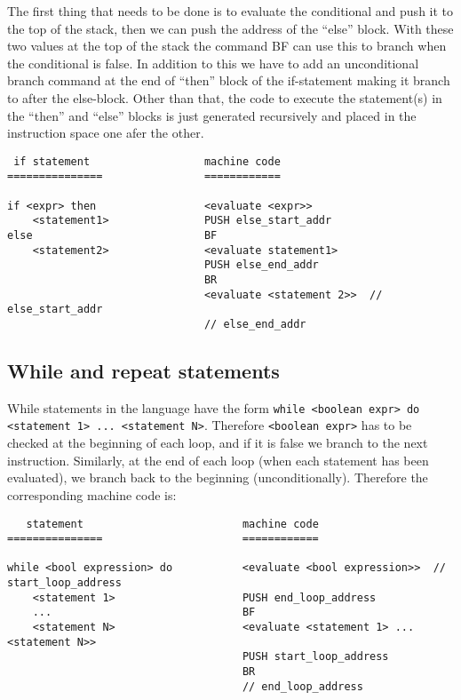 \documentclass[11pt]{article}
\begin{document}
The first thing that needs to be done is to evaluate the conditional and push it to the top of the stack, then we can push the address of the ``else'' block. With these two values at the top of the stack the command BF can use this to branch when the conditional is false. In addition to this we have to add an unconditional branch command at the end of ``then'' block of the if-statement making it branch to after the else-block. Other than that, the code to execute the statement(s) in the ``then'' and ``else'' blocks is just generated recursively and placed in the instruction space one afer the other.

\begin{verbatim}
 if statement                  machine code
===============                ============

if <expr> then                 <evaluate <expr>>
    <statement1>               PUSH else_start_addr
else                           BF
    <statement2>               <evaluate statement1>
                               PUSH else_end_addr
                               BR
                               <evaluate <statement 2>>  // else_start_addr
                               // else_end_addr
\end{verbatim}

\subsection{While and repeat statements}

While statements in the language have the form \texttt{while <boolean expr> do <statement 1> ... <statement N>}. Therefore \texttt{<boolean expr>} has to be checked at the beginning of each loop, and if it is false we branch to the next instruction. Similarly, at the end of each loop (when each statement has been evaluated), we branch back to the beginning (unconditionally). Therefore the corresponding machine code is:

\begin{verbatim}
   statement                         machine code
===============                      ============

while <bool expression> do           <evaluate <bool expression>>  // start_loop_address
    <statement 1>                    PUSH end_loop_address
    ...                              BF
    <statement N>                    <evaluate <statement 1> ... <statement N>>
                                     PUSH start_loop_address
                                     BR
                                     // end_loop_address
\end{verbatim}
\end{document}
